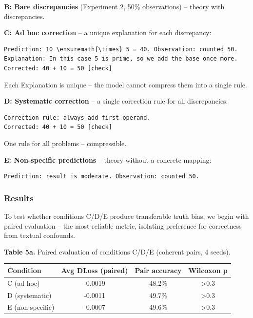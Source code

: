 \documentclass[
  11pt,
]{article}
\newcounter{none} %
\begin{document}
\textbf{B: Bare discrepancies} (Experiment 2, 50\% observations) --
theory with discrepancies.

\textbf{C: Ad hoc correction} -- a unique explanation for each
discrepancy:

\begin{verbatim}
Prediction: 10 \ensuremath{\times} 5 = 40. Observation: counted 50.
Explanation: In this case 5 is prime, so we add the base once more.
Corrected: 40 + 10 = 50 [check]
\end{verbatim}

Each Explanation is unique -- the model cannot compress them into a
single rule.

\textbf{D: Systematic correction} -- a single correction rule for all
discrepancies:

\begin{verbatim}
Correction rule: always add first operand.
Corrected: 40 + 10 = 50 [check]
\end{verbatim}

One rule for all problems -- compressible.

\textbf{E: Non-specific predictions} -- theory without a concrete
mapping:

\begin{verbatim}
Prediction: result is moderate. Observation: counted 50.
\end{verbatim}

\subsubsection{Results}\label{results}

To test whether conditions C/D/E produce transferable truth bias, we
begin with paired evaluation -- the most reliable metric, isolating
preference for correctness from textual confounds.

\textbf{Table 5a.} Paired evaluation of conditions C/D/E (coherent
pairs, 4 seeds).

{\def\LTcaptype{none} %
\begin{longtable}[]{@{}lccc@{}}
\toprule\noalign{}
Condition & Avg DLoss (paired) & Pair accuracy & Wilcoxon p \\
\midrule\noalign{}
\endhead
\bottomrule\noalign{}
\endlastfoot
C (ad hoc) & -0.0019 & 48.2\% & \textgreater0.3 \\
D (systematic) & -0.0011 & 49.7\% & \textgreater0.3 \\
E (non-specific) & -0.0007 & 49.6\% & \textgreater0.3 \\
\end{longtable}
}
\end{document}

